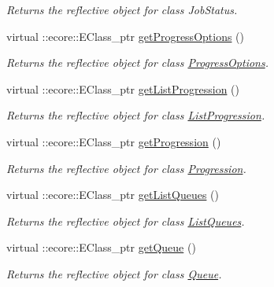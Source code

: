 \begin{DoxyCompactItemize}
\begin{DoxyCompactList}\small\item\em Returns the reflective object for class JobStatus. \item\end{DoxyCompactList}\item 
virtual ::ecore::EClass\_\-ptr \hyperlink{classTMS__Data_1_1TMS__DataPackage_a27794ef5817dcf493ddeea68f8c915d5}{getProgressOptions} ()
\begin{DoxyCompactList}\small\item\em Returns the reflective object for class \hyperlink{classTMS__Data_1_1ProgressOptions}{ProgressOptions}. \item\end{DoxyCompactList}\item 
virtual ::ecore::EClass\_\-ptr \hyperlink{classTMS__Data_1_1TMS__DataPackage_a83590db31b82d5089c1dd84c98978a0b}{getListProgression} ()
\begin{DoxyCompactList}\small\item\em Returns the reflective object for class \hyperlink{classTMS__Data_1_1ListProgression}{ListProgression}. \item\end{DoxyCompactList}\item 
virtual ::ecore::EClass\_\-ptr \hyperlink{classTMS__Data_1_1TMS__DataPackage_a5f739ceb3967dadb3212a78e5725be98}{getProgression} ()
\begin{DoxyCompactList}\small\item\em Returns the reflective object for class \hyperlink{classTMS__Data_1_1Progression}{Progression}. \item\end{DoxyCompactList}\item 
virtual ::ecore::EClass\_\-ptr \hyperlink{classTMS__Data_1_1TMS__DataPackage_a4744c36720d8fcd40829b8297fa11917}{getListQueues} ()
\begin{DoxyCompactList}\small\item\em Returns the reflective object for class \hyperlink{classTMS__Data_1_1ListQueues}{ListQueues}. \item\end{DoxyCompactList}\item 
virtual ::ecore::EClass\_\-ptr \hyperlink{classTMS__Data_1_1TMS__DataPackage_a4a7749bd7a7142ae78fa7426025fce04}{getQueue} ()
\begin{DoxyCompactList}\small\item\em Returns the reflective object for class \hyperlink{classTMS__Data_1_1Queue}{Queue}. \item\end{DoxyCompactList}\item 

\end{DoxyCompactItemize}
